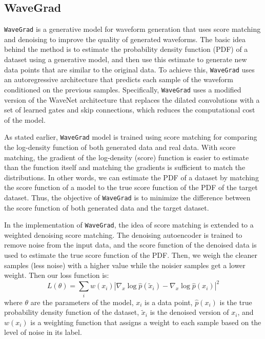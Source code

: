 \subsection{WaveGrad}
\texttt{WaveGrad} \cite{chen2020wavegrad} is a generative model for waveform generation that uses score matching \cite{song2020sliced, song2020improved} and denoising \cite{sohl2015deep, ho2020denoising} to improve the quality of generated waveforms. 
The basic idea behind the method is to estimate the probability density function (PDF) of a dataset using a generative model, and then use this estimate to generate new data points that are similar to the original data. To achieve this, \texttt{WaveGrad} uses an autoregressive architecture that predicts each sample of the waveform conditioned on the previous samples.
Specifically, \texttt{WaveGrad} uses a modified version of the WaveNet architecture that replaces the dilated convolutions with a set of learned gates and skip connections, which reduces the computational cost of the model.

As stated earlier, \texttt{WaveGrad} model is trained using score matching for comparing the log-density function of both generated data and real data.
With score matching, the gradient of the log-density (score) function is easier to estimate than the function itself and matching the gradients is sufficient to match the distributions.
In other words, we can estimate the PDF of a dataset by matching the score function of a model to the true score function of the PDF of the target dataset.
Thus, the objective of \texttt{WaveGrad} is to minimize the difference between the score function of both generated data and the target dataset.

In the implementation of \texttt{WaveGrad}, the idea of score matching is extended to a weighted denoising score matching.
The denoising autoencoder is trained to remove noise from the input data, and the score function of the denoised data is used to estimate the true score function of the PDF.
Then, we weigh the cleaner samples (less noise) with a higher value while the noisier samples get a lower weight. Then our loss function is:
\begin{equation}
    L(\theta) = \sum_i w(x_i) |\nabla_x \log \hat{p}(\tilde{x}_i) - \nabla_x \log \hat{p}(x_i)|^2
\end{equation} where $\theta$ are the parameters of the model, $x_i$ is a data point, $\hat{p}(x_i)$ is the true probability density function of the dataset, $\tilde{x}_i$ is the denoised version of $x_i$, and $w(x_i)$ is a weighting function that assigns a weight to each sample based on the level of noise in its label.

